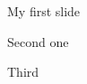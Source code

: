 \documentclass[handout]{beamer}
\begin{document}
\begin{frame}
My first slide
\end{frame}
\begin{frame}
Second one
\end{frame}
\begin{frame}
Third
\end{frame}
\end{document}
